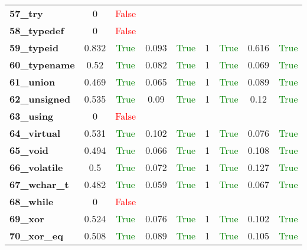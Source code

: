 \documentclass{article}
\begin{document}
\begin{xltabular}{\textwidth}{lcccccccc}
\textbf{57\_try}& 0&\textcolor{red}{False} \\[0.5ex]
\textbf{58\_typedef}& 0&\textcolor{red}{False} \\[0.5ex]
\textbf{59\_typeid}& 0.832&\textcolor{green}{True}& 0.093&\textcolor{green}{True}& 1&\textcolor{green}{True}& 0.616&\textcolor{green}{True} \\[0.5ex]
\textbf{60\_typename}& 0.52&\textcolor{green}{True}& 0.082&\textcolor{green}{True}& 1&\textcolor{green}{True}& 0.069&\textcolor{green}{True} \\[0.5ex]
\textbf{61\_union}& 0.469&\textcolor{green}{True}& 0.065&\textcolor{green}{True}& 1&\textcolor{green}{True}& 0.089&\textcolor{green}{True} \\[0.5ex]
\textbf{62\_unsigned}& 0.535&\textcolor{green}{True}& 0.09&\textcolor{green}{True}& 1&\textcolor{green}{True}& 0.12&\textcolor{green}{True} \\[0.5ex]
\textbf{63\_using}& 0&\textcolor{red}{False} \\[0.5ex]
\textbf{64\_virtual}& 0.531&\textcolor{green}{True}& 0.102&\textcolor{green}{True}& 1&\textcolor{green}{True}& 0.076&\textcolor{green}{True} \\[0.5ex]
\textbf{65\_void}& 0.494&\textcolor{green}{True}& 0.066&\textcolor{green}{True}& 1&\textcolor{green}{True}& 0.108&\textcolor{green}{True} \\[0.5ex]
\textbf{66\_volatile}& 0.5&\textcolor{green}{True}& 0.072&\textcolor{green}{True}& 1&\textcolor{green}{True}& 0.127&\textcolor{green}{True} \\[0.5ex]
\textbf{67\_wchar\_t}& 0.482&\textcolor{green}{True}& 0.059&\textcolor{green}{True}& 1&\textcolor{green}{True}& 0.067&\textcolor{green}{True} \\[0.5ex]
\textbf{68\_while}& 0&\textcolor{red}{False} \\[0.5ex]
\textbf{69\_xor}& 0.524&\textcolor{green}{True}& 0.076&\textcolor{green}{True}& 1&\textcolor{green}{True}& 0.102&\textcolor{green}{True} \\[0.5ex]
\textbf{70\_xor\_eq}& 0.508&\textcolor{green}{True}& 0.089&\textcolor{green}{True}& 1&\textcolor{green}{True}& 0.105&\textcolor{green}{True} \\[0.5ex]
\bottomrule
\end{xltabular}
\end{document}
